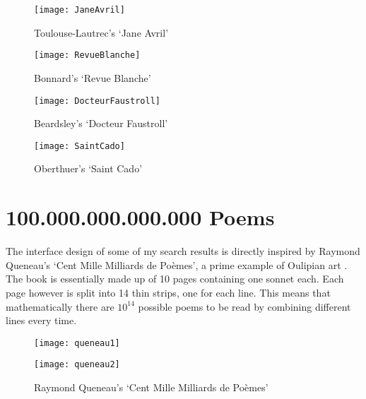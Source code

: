 \begin{figure}
\centering
\begin{minipage}{.45\linewidth}
  \texttt{[image: JaneAvril]}
  \caption[Toulouse-Lautrec's `Jane Avril']{Toulouse-Lautrec's `Jane Avril'}
\label{fig:toulouse}
\end{minipage}
\hspace{.05\linewidth}
\begin{minipage}{.45\linewidth}
  \texttt{[image: RevueBlanche]}
  \caption[Bonnard's `Revue Blanche']{Bonnard's `Revue Blanche'}
\label{fig:bonnard}
\end{minipage}
\vspace{.05\linewidth}
\begin{minipage}{.45\linewidth}
  \texttt{[image: DocteurFaustroll]}
  \caption[Beardsley's `Docteur Faustroll']{Beardsley's `Docteur Faustroll'}
\label{fig:beardsley}
\end{minipage}
\hspace{.05\linewidth}
\begin{minipage}{.45\linewidth}
  \texttt{[image: SaintCado]}
  \caption[Oberthuer's `Saint Cado']{Oberthuer's `Saint Cado'}
\label{fig:oberthuer}
\end{minipage}
\end{figure}



\section{100.000.000.000.000 Poems}

The interface design of some of my search results is directly inspired by
Raymond Queneau's `Cent Mille Milliards de Poèmes', a prime example of Oulipian art \autocite{Queneau1961}. The book is essentially made up of 10 pages containing one sonnet each. Each page however is split into 14 thin strips, one for each line. This means that mathematically there are $10^{14}$ possible poems to be read by combining different lines every time.

\begin{figure}[h!]
\centering
\begin{minipage}{.45\linewidth}
  \texttt{[image: queneau1]}
\end{minipage}
\hspace{.05\linewidth}
\begin{minipage}{.45\linewidth}
  \texttt{[image: queneau2]}
\end{minipage}
\caption[Queneau's `Cent Mille Milliards de Poèmes']{Raymond Queneau's `Cent Mille Milliards de Poèmes'\footnotemark}
\label{fig:queneau12}
\end{figure}

